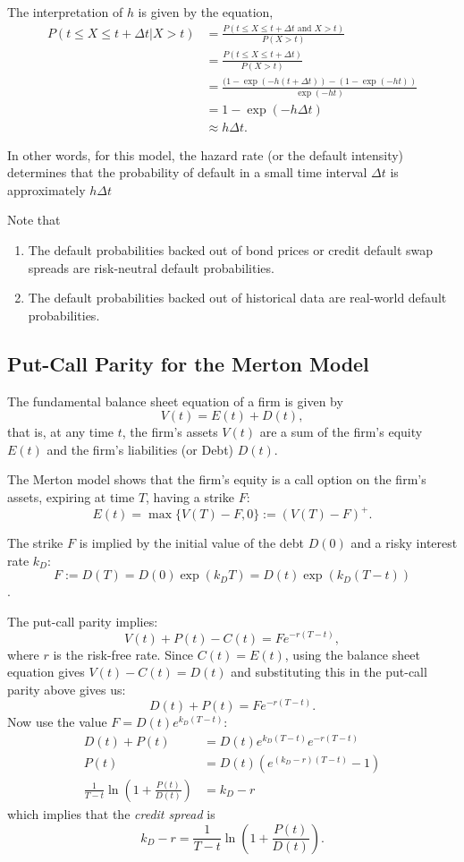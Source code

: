 \documentclass{amsart}
\theoremstyle{plain}
\numberwithin{equation}{section}
\begin{document}
The interpretation of $h$ is given by the equation,
\begin{align*}
P( t \leq X \leq t + \Delta t | X > t ) &=\frac{P( t \leq X \leq t + \Delta t \mbox{ and } X > t )}{P(X >t)}\\
&= \frac{P( t \leq X \leq t + \Delta t)}{P(X >t)}\\
&= \frac{(1-\exp(-h(t+\Delta t))-(1-\exp(-ht))}{\exp(-ht)}\\
&= 1 - \exp(-h\Delta t)\\
& \approx h \Delta t.
\end{align*}

In other words, for this model, the hazard rate (or the default intensity) determines that the probability of 
default in a small time interval $\Delta t$ is approximately 
$h \Delta t$

Note that 
\begin{enumerate}
	\item The default probabilities backed out of bond prices or credit default 
	swap spreads are risk-neutral default probabilities.
	\item The default probabilities backed out of historical data are 
	real-world default probabilities.
\end{enumerate}

\subsection{Put-Call Parity for the Merton Model}
The fundamental balance sheet equation of a firm
is given by
$$V(t) = E(t) + D(t),$$
that is, at any time $t$, the firm's assets $V(t)$ are 
a sum of the firm's equity $E(t)$ and the firm's 
liabilities (or Debt)  $D(t)$.

The Merton model shows that the firm's equity is 
a call option on the firm's assets, expiring at 
time $T$, having a strike $F$:
$$E(t) = \max\{V(T)-F,0\} := \left(V(T) - F\right)^{+}.$$

The strike $F$ is implied by the initial value of the 
debt $D(0)$ and a risky interest rate $k_D$:
$$F := D(T) = D(0)\exp(k_DT) = D(t)\exp(k_D(T-t))$$.

The put-call parity implies:
$$V(t) + P(t) - C(t) = F e^{-r(T-t)},$$
where $r$ is the risk-free rate.
Since $C(t) = E(t)$, using the balance 
sheet equation gives $V(t)-C(t)=D(t)$ and 
substituting this in the put-call parity 
above gives us:
$$D(t) + P(t) = F e^{-r(T-t)}.$$
Now use the value $F = D(t) e^{k_D(T-t)}$:
\begin{align*}
D(t) + P(t) &= D(t) e^{k_D(T-t)} e^{-r(T-t)}\\
P(t) &= D(t)\left(e^{(k_D-r)(T-t)} - 1\right)\\
\frac{1}{T-t}\ln\left(1+\frac{P(t)}{D(t)}\right) &= k_D-r
\end{align*}
which implies that the \emph{credit spread} 
is 
$$k_D - r = \frac{1}{T-t}\ln\left(1+\frac{P(t)}{D(t)}\right).$$
\end{document}
